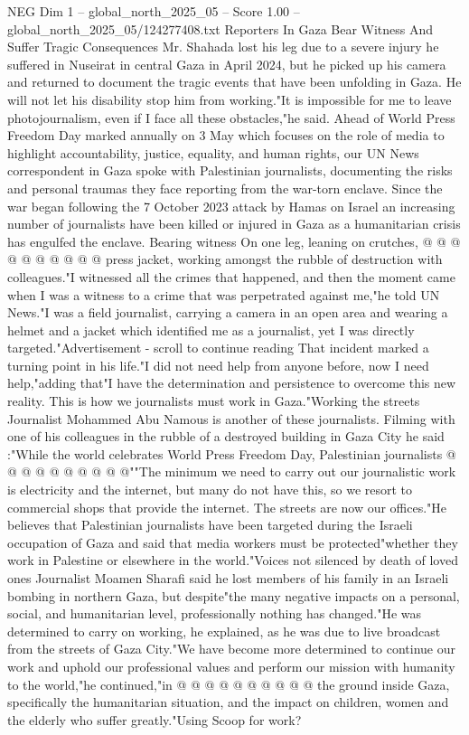 \begin{textsample}{NEG Dim 1 – global\_north\_2025\_05 – Score 1.00 – global\_north\_2025\_05/124277408.txt}  \label{ex:f1_neg_084}
Reporters In Gaza Bear Witness And Suffer Tragic Consequences Mr.
Shahada lost his leg due to a severe injury he suffered in Nuseirat in central Gaza in April 2024, but he picked up his camera and returned to document the tragic events that have been unfolding in Gaza.
He will not let his disability stop him from working."It is impossible for me to leave photojournalism, even if I face all these obstacles,"he said.
Ahead of World Press Freedom Day marked annually on 3 May which focuses on the role of media to highlight accountability, justice, equality, and human rights, our UN News correspondent in Gaza spoke with Palestinian journalists, documenting the risks and personal traumas they face reporting from the war-torn enclave.
Since the war began following the 7 October 2023 attack by Hamas on Israel an increasing number of journalists have been killed or injured in Gaza as a humanitarian crisis has engulfed the enclave.
Bearing witness On one leg, leaning on crutches, @ @ @ @ @ @ @ @ @ @ press jacket, working amongst the rubble of destruction with colleagues."I witnessed all the crimes that happened, and then the moment came when I was a witness to a crime that was perpetrated against me,"he told UN News."I was a field journalist, carrying a camera in an open area and wearing a helmet and a jacket which identified me as a journalist, yet I was directly targeted."Advertisement - scroll to continue reading That incident marked a turning point in his life."I did not need help from anyone before, now I need help,"adding that"I have the determination and persistence to overcome this new reality.
This is how we journalists must work in Gaza."Working the streets Journalist Mohammed Abu Namous is another of these journalists.
Filming with one of his colleagues in the rubble of a destroyed building in Gaza City he said :"While the world celebrates World Press Freedom Day, Palestinian journalists @ @ @ @ @ @ @ @ @ @""The minimum we need to carry out our journalistic work is electricity and the internet, but many do not have this, so we resort to commercial shops that provide the internet.
The streets are now our offices."He believes that Palestinian journalists have been targeted during the Israeli occupation of Gaza and said that media workers must be protected"whether they work in Palestine or elsewhere in the world."Voices not silenced by death of loved ones Journalist Moamen Sharafi said he lost members of his family in an Israeli bombing in northern Gaza, but despite"the many negative impacts on a personal, social, and humanitarian level, professionally nothing has changed."He was determined to carry on working, he explained, as he was due to live broadcast from the streets of Gaza City."We have become more determined to continue our work and uphold our professional values and perform our mission with humanity to the world,"he continued,"in @ @ @ @ @ @ @ @ @ @ the ground inside Gaza, specifically the humanitarian situation, and the impact on children, women and the elderly who suffer greatly."Using Scoop for work?

\end{textsample}
